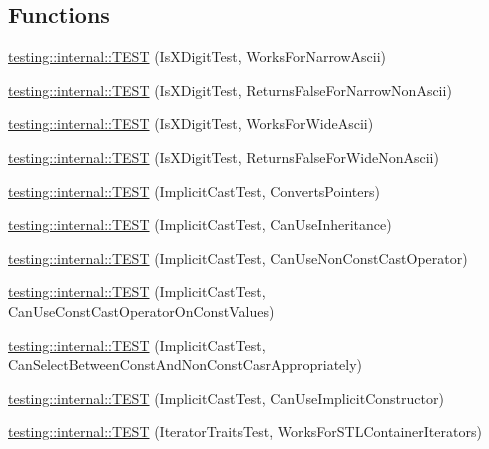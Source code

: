 \subsection*{Functions}
\begin{DoxyCompactItemize}
\item 
\hyperlink{namespacetesting_1_1internal_a0c1e055c001e4dbb874f00a46c25bb00}{testing\+::internal\+::\+T\+E\+ST} (Is\+X\+Digit\+Test, Works\+For\+Narrow\+Ascii)
\item 
\hyperlink{namespacetesting_1_1internal_a7cd9d67d4164d2aeb4ceb3ed253c7d2d}{testing\+::internal\+::\+T\+E\+ST} (Is\+X\+Digit\+Test, Returns\+False\+For\+Narrow\+Non\+Ascii)
\item 
\hyperlink{namespacetesting_1_1internal_af76bca685fddffc0ecda1464b1b6a0a4}{testing\+::internal\+::\+T\+E\+ST} (Is\+X\+Digit\+Test, Works\+For\+Wide\+Ascii)
\item 
\hyperlink{namespacetesting_1_1internal_a771232ed3801fa49cbd4bbe11b318fe3}{testing\+::internal\+::\+T\+E\+ST} (Is\+X\+Digit\+Test, Returns\+False\+For\+Wide\+Non\+Ascii)
\item 
\hyperlink{namespacetesting_1_1internal_a5d2ec1128c80363b06070f403f682490}{testing\+::internal\+::\+T\+E\+ST} (Implicit\+Cast\+Test, Converts\+Pointers)
\item 
\hyperlink{namespacetesting_1_1internal_a1b304dcd3ac71095f2e7d9e9b43c4755}{testing\+::internal\+::\+T\+E\+ST} (Implicit\+Cast\+Test, Can\+Use\+Inheritance)
\item 
\hyperlink{namespacetesting_1_1internal_a8554484c7c0ea536bc393c254490aaff}{testing\+::internal\+::\+T\+E\+ST} (Implicit\+Cast\+Test, Can\+Use\+Non\+Const\+Cast\+Operator)
\item 
\hyperlink{namespacetesting_1_1internal_af7f631f9fbde27b19a65d50fc29e1420}{testing\+::internal\+::\+T\+E\+ST} (Implicit\+Cast\+Test, Can\+Use\+Const\+Cast\+Operator\+On\+Const\+Values)
\item 
\hyperlink{namespacetesting_1_1internal_a62a3b62658f9d47733cb7b5c8f69b2ad}{testing\+::internal\+::\+T\+E\+ST} (Implicit\+Cast\+Test, Can\+Select\+Between\+Const\+And\+Non\+Const\+Casr\+Appropriately)
\item 
\hyperlink{namespacetesting_1_1internal_ad5c2cf37cc5aa78744012255cae78f9b}{testing\+::internal\+::\+T\+E\+ST} (Implicit\+Cast\+Test, Can\+Use\+Implicit\+Constructor)
\item 
\hyperlink{namespacetesting_1_1internal_abd56ca990c5b8c1aea44d15028a74f33}{testing\+::internal\+::\+T\+E\+ST} (Iterator\+Traits\+Test, Works\+For\+S\+T\+L\+Container\+Iterators)

\end{DoxyCompactItemize}
